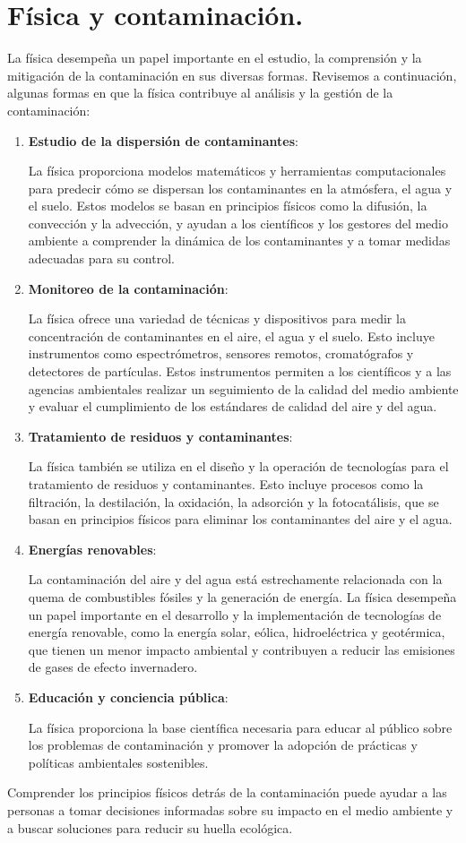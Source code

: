 \documentclass[12pt]{article}
\begin{document}
\section{Física y contaminación.}

La física desempeña un papel importante en el estudio, la comprensión y la mitigación de la contaminación en sus diversas formas. Revisemos a continuación, algunas formas en que la física contribuye al análisis y la gestión de la contaminación:
\begin{enumerate}
\item \textbf{Estudio de la dispersión de contaminantes}:

La física proporciona modelos matemáticos y herramientas computacionales para predecir cómo se dispersan los contaminantes en la atmósfera, el agua y el suelo. Estos modelos se basan en principios físicos como la difusión, la convección y la advección, y ayudan a los científicos y los gestores del medio ambiente a comprender la dinámica de los contaminantes y a tomar medidas adecuadas para su control.
\item \textbf{Monitoreo de la contaminación}:

La física ofrece una variedad de técnicas y dispositivos para medir la concentración de contaminantes en el aire, el agua y el suelo. Esto incluye instrumentos como espectrómetros, sensores remotos, cromatógrafos y detectores de partículas. Estos instrumentos permiten a los científicos y a las agencias ambientales realizar un seguimiento de la calidad del medio ambiente y evaluar el cumplimiento de los estándares de calidad del aire y del agua.
\item \textbf{Tratamiento de residuos y contaminantes}:

La física también se utiliza en el diseño y la operación de tecnologías para el tratamiento de residuos y contaminantes. Esto incluye procesos como la filtración, la destilación, la oxidación, la adsorción y la fotocatálisis, que se basan en principios físicos para eliminar los contaminantes del aire y el agua.
\item \textbf{Energías renovables}:

La contaminación del aire y del agua está estrechamente relacionada con la quema de combustibles fósiles y la generación de energía. La física desempeña un papel importante en el desarrollo y la implementación de tecnologías de energía renovable, como la energía solar, eólica, hidroeléctrica y geotérmica, que tienen un menor impacto ambiental y contribuyen a reducir las emisiones de gases de efecto invernadero.
\item \textbf{Educación y conciencia pública}:

La física proporciona la base científica necesaria para educar al público sobre los problemas de contaminación y promover la adopción de prácticas y políticas ambientales sostenibles.
\end{enumerate}
Comprender los principios físicos detrás de la contaminación puede ayudar a las personas a tomar decisiones informadas sobre su impacto en el medio ambiente y a buscar soluciones para reducir su huella ecológica.
\end{document}
